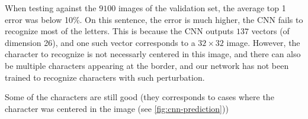 \documentclass{article}
\newcommand{\hc}[1]{{\color{highlightcolor} \textbf{#1}}}
\begin{document}

When testing against the $9100$ images of the validation set, the
average top 1 error was below 10\%. On this sentence, the error is
much higher, the CNN fails to recognize most of the letters.  This is
because the CNN outputs $137$ vectors (of dimension 26), and one such
vector corresponds to a $32 \times 32$ image. However, the character
to recognize is not necessarly centered in this image, and there can
also be multiple characters appearing at the border, and our network
has not been trained to recognize characters with such perturbation.

Some of the characters are still good (they corresponds to cases where
the character was centered in the image (see \ref{fig:cnn-prediction}))



\end{document}
